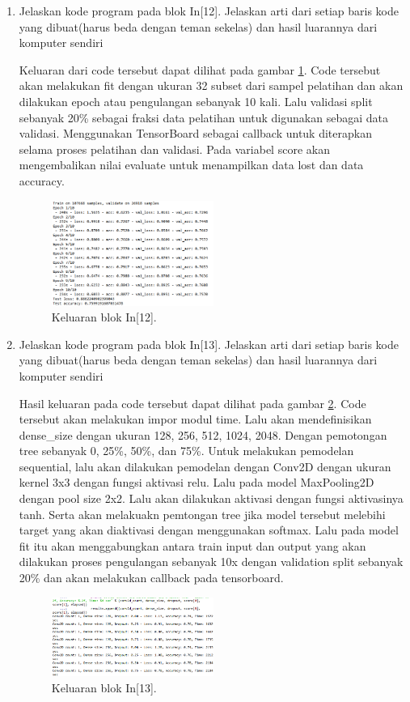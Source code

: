 \begin{enumerate}
\item Jelaskan kode program pada blok In[12]. Jelaskan arti dari setiap baris kode yang dibuat(harus beda dengan teman sekelas) dan hasil luarannya dari komputer sendiri \par

Keluaran dari code tersebut dapat dilihat pada gambar \ref{math12}. Code tersebut akan melakukan fit dengan ukuran 32 subset dari sampel pelatihan dan akan dilakukan epoch atau pengulangan sebanyak 10 kali. Lalu validasi split sebanyak 20\% sebagai fraksi data pelatihan untuk digunakan sebagai data validasi. Menggunakan TensorBoard sebagai callback untuk diterapkan selama proses pelatihan dan validasi. Pada variabel score akan mengembalikan nilai evaluate untuk menampilkan data lost dan data accuracy.
		\begin{figure}[!htbp]
		\centerline{\includegraphics[width=0.5\textwidth]{figures/im/math12.png}}
		\caption{Keluaran blok In[12].}
		\label{math12}
		\end{figure}

\item Jelaskan kode program pada blok In[13]. Jelaskan arti dari setiap baris kode yang dibuat(harus beda dengan teman sekelas) dan hasil luarannya dari komputer sendiri \par

Hasil keluaran pada code tersebut dapat dilihat pada gambar \ref{math13}. Code tersebut akan melakukan impor modul time. Lalu akan mendefinisikan dense\_size dengan ukuran 128, 256, 512, 1024, 2048. Dengan pemotongan tree sebanyak 0, 25\%, 50\%, dan 75\%. Untuk melakukan pemodelan sequential, lalu akan dilakukan pemodelan dengan Conv2D dengan ukuran kernel 3x3 dengan fungsi aktivasi relu. Lalu pada model MaxPooling2D dengan pool size 2x2. Lalu akan dilakukan aktivasi dengan fungsi aktivasinya tanh. Serta akan melakuakn pemtongan tree jika model tersebut melebihi target yang akan diaktivasi dengan menggunakan softmax. Lalu pada model fit itu akan menggabungkan antara train input dan output yang akan dilakukan proses pengulangan sebanyak 10x dengan validation split sebanyak 20\% dan akan melakukan callback pada tensorboard.
		\begin{figure}[!htbp]
		\centerline{\includegraphics[width=0.5\textwidth]{figures/im/math13.png}}
		\caption{Keluaran blok In[13].}
		\label{math13}
		\end{figure}


\end{enumerate}
